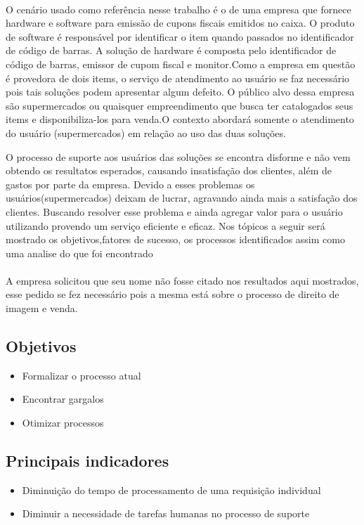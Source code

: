 \documentclass[11pt,a4paper]{article}
\begin{document}
	\paragraph{}
	O cenário usado como referência nesse trabalho é o de uma empresa que 
	fornece hardware e software para emissão de cupons fiscais emitidos no
	caixa. O produto de software é responsável por identificar o item quando passados no 
	identificador de código de barras. A solução de hardware é composta pelo identificador
	de código de barras, emissor de cupom fiscal e monitor.Como a empresa em questão é 
	provedora de dois items, o serviço de atendimento ao 
	usuário se faz necessário pois tais soluções podem apresentar algum defeito. O público alvo
	dessa empresa são supermercados ou quaisquer empreendimento que busca ter catalogados seus items
	e disponibiliza-los para venda.O contexto abordará somente o atendimento do usuário (supermercados) em 
	relação ao uso das duas soluções.
		
		O processo de suporte aos usuários das soluções se encontra disforme e não vem obtendo
	os resultatos esperados, causando insatisfação dos clientes, além de gastos por parte da empresa.
	Devido a esses problemas os usuários(supermercados) deixam de lucrar, agravando ainda mais a satisfação
	dos clientes. Buscando resolver esse problema e ainda agregar valor para o usuário utilizando provendo
	um serviço eficiente e eficaz. 
	Nos tópicos a seguir será mostrado os objetivos,fatores de sucesso, os processos
	identificados assim como uma analise do que foi encontrado 
	
	\paragraph{}A empresa solicitou que seu nome não fosse citado nos resultados aqui mostrados, esse pedido
	se fez necessário pois a mesma está sobre o processo de direito de imagem e venda.	
		
\subsection{Objetivos}
\begin{itemize}[noitemsep]
  \item Formalizar o processo atual
  \item Encontrar gargalos
  \item Otimizar processos
\end{itemize}

\subsection{Principais indicadores}
\begin{itemize}[noitemsep]
  \item Diminuição do tempo de processamento de uma requisição individual
  \item Diminuir a necessidade de tarefas humanas no processo de suporte
\end{itemize}
\end{document}
